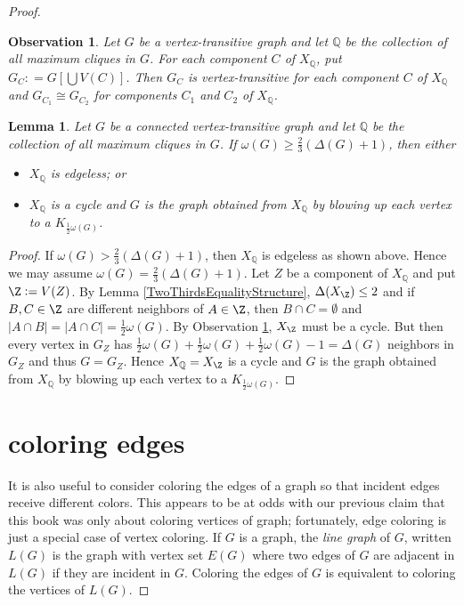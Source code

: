 \documentclass{amsbook}
\theoremstyle{plain}
\newtheorem{lemma}{Lemma}
\newtheorem{observation}{Observation}
\numberwithin{equation}{chapter}
\newcommand{\card}[1]{\left|#1\right|}
\newcommand{\parens}[1]{\left( #1 \right)}
\newcommand{\brackets}[1]{\left[ #1 \right]}
\newcommand{\DefinedAs}{\mathrel{\mathop:}=}
\newcommand{\Q}{\mathbb{Q}}
\begin{document}
\begin{proof}
\begin{observation}\label{transitiveClustering}
Let $G$ be a vertex-transitive graph and let $\Q$ be the collection of all
maximum cliques in $G$.  For each component $C$ of $X_\Q$, put $G_C \DefinedAs
G\brackets{\bigcup V(C)}$.  Then $G_C$ is vertex-transitive for each component
$C$ of $X_\Q$ and $G_{C_1} \cong G_{C_2}$ for components $C_1$ and $C_2$ of
$X_\Q$.
\end{observation}

\begin{lemma}\label{TransitiveClusteringBigCliques}
Let $G$ be a connected vertex-transitive graph and let $\Q$ be the collection
of all maximum cliques in $G$.  If $\omega(G) \ge \frac23 \parens{\Delta(G) +
1}$, then either
\begin{itemize}
\item $X_\Q$ is edgeless; or
\item $X_\Q$ is a cycle and $G$ is the graph obtained from $X_\Q$ by blowing up each vertex to a $K_{\frac12 \omega(G)}$.
\end{itemize}
\end{lemma}
\begin{proof}
If $\omega(G) > \frac23 \parens{\Delta(G) + 1}$, then $X_\Q$ is edgeless as shown above.  Hence we may assume $\omega(G) = \frac23 \parens{\Delta(G) + 1}$.  
Let $Z$ be a component of $X_\Q$ and put $\Z \DefinedAs V(Z)$.
By Lemma \ref{TwoThirdsEqualityStructure}, $\Delta(X_\Z) \le 2$ and if $B, C \in \Z$ are 
different neighbors of $A \in \Z$, then $B \cap C = \emptyset$ and $\card{A \cap B} = \card{A \cap C} = \frac12 \omega(G)$.  
By Observation \ref{transitiveClustering}, $X_\Z$ must be a cycle.  But then every vertex in $G_Z$ has 
$\frac12 \omega(G) + \frac12 \omega(G) + \frac12 \omega(G) - 1 = \Delta(G)$ neighbors in $G_Z$ and thus $G = G_Z$.  
Hence $X_\Q = X_\Z$ is a cycle and $G$ is the graph obtained from $X_\Q$ by blowing up each vertex to a $K_{\frac12 \omega(G)}$.
\end{proof}


\chapter*{coloring edges}
It is also useful to consider coloring the edges of a graph so that incident edges receive different colors.  This
appears to be at odds with our previous claim that this book was only about coloring vertices of graph; fortunately, edge coloring
is just a special case of vertex coloring.  If $G$ is a graph, the \emph{line graph} of $G$, written
$L(G)$ is the graph with vertex set $E(G)$ where two edges of $G$ are adjacent in $L(G)$ if they are incident in $G$.  Coloring
the edges of $G$ is equivalent to coloring the vertices of $L(G)$.


\end{proof}
\end{document}
